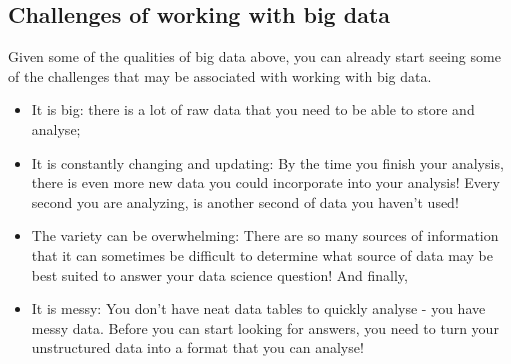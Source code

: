 \documentclass[11pt,fancy]{elegantbook}
\begin{document}
\subsection{Challenges of working with big data}
Given some of the qualities of big data above, you can already start seeing some of the challenges that may be associated with working with big data.
\begin{itemize}
    \item It is big: there is a lot of raw data that you need to be able to store and analyse;
    \item It is constantly changing and updating: By the time you finish your analysis, there is even more new data you could incorporate into your analysis! Every second you are analyzing, is another second of data you haven't used!
    \item The variety can be overwhelming: There are so many sources of information that it can sometimes be difficult to determine what source of data may be best suited to answer your data science question! And finally,
    \item It is messy: You don't have neat data tables to quickly analyse - you have messy data. Before you can start looking for answers, you need to turn your unstructured data into a format that you can analyse!
\end{itemize}
\end{document}
